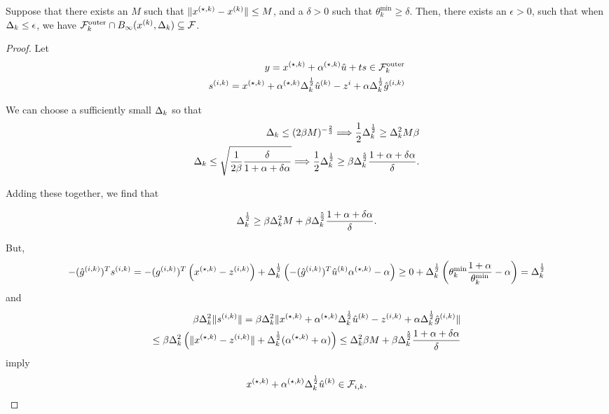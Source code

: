 \begin{theorem}
Suppose that there exists an $M$ such that $\|{x^{(\star, k)}} - {x^{(k)}}\| \le M$, and a $\delta > 0$ such that $\theta^{\text{min}}_k \ge \delta$.
Then, there exists an $\epsilon > 0$, such that when $\Delta_k \le \epsilon$, we have $ {\mathcal {F}^{\text{outer}}_k} \cap B_{\infty}({x^{(k)}}, \Delta_k) \subseteq \mathcal F$.
\end{theorem}

\begin{proof}
Let
\begin{align*}
y = {x^{(\star, k)}} + {\alpha^{(\star, k)}} \hat u + ts \in {\mathcal {F}^{\text{outer}}_k} \\
s^{(i, k)} = {x^{(\star, k)}} + {\alpha^{(\star, k)}}\Delta_k^{\frac 1 2}{{\hat u}^{(k)}} - z^i + \alpha\Delta_k^{\frac 1 2}{{\hat g}^{(i, k)}}\\
\end{align*}

We can choose a sufficiently small $\Delta_k$ so that
\begin{align*}
\Delta_k \le (2\beta M)^{-\frac 2 3} \Longrightarrow \frac 1 2 \Delta_k^{\frac 1 2 } \ge \Delta_k^2 M\beta \\
\Delta_k \le \sqrt{\frac 1 {2\beta} \frac{\delta}{1 + \alpha + \delta\alpha}} \Longrightarrow \frac 1 2 \Delta_k^{\frac 1 2 } \ge \beta\Delta_k^{\frac 5 2}\frac{1 + \alpha + \delta\alpha}{\delta}.
\end{align*}

Adding these together, we find that

\begin{align*}
\Delta_k^{\frac 1 2 } \ge \beta \Delta_k^2 M + \beta \Delta_k^{\frac 5 2}\frac{1 + \alpha + \delta\alpha}{\delta}.
\end{align*}

But,
\begin{align*}
-({{\hat g}^{(i, k)}})^T s^{(i, k)} = -({g^{(i, k)}})^T \left({x^{(\star, k)}} - {z^{(i, k)}}\right) + \Delta_k^{\frac 1 2}\left(-({{\hat g}^{(i, k)}})^T{{\hat u}^{(k)}}{\alpha^{(\star, k)}} - \alpha\right)
\ge 0 + \Delta_k^{\frac 1 2}\left(\theta^{\text{min}}_k \frac{1 + \alpha}{\theta^{\text{min}}_k} - \alpha\right) = \Delta_k^{\frac 1 2 }\\
\end{align*}
and
\begin{align*}
\beta\Delta_k^2\|s^{(i, k)}\| = \beta\Delta_k^2\|{x^{(\star, k)}} + {\alpha^{(\star, k)}}\Delta_k^{\frac 1 2}{{\hat u}^{(k)}} - {z^{(i, k)}} + \alpha\Delta_k^{\frac 1 2}{{\hat g}^{(i, k)}} \| \\
\le \beta\Delta_k^2\left(\|{x^{(\star, k)}} - {z^{(i, k)}} \| + \Delta_k^{\frac 1 2} ({\alpha^{(\star, k)}} + \alpha)\right) 
\le \Delta_k^2\beta M + \beta \Delta_k^{\frac 5 2}\frac{1 + \alpha + \delta\alpha}{\delta}
\end{align*}
imply 
\begin{align*}
{x^{(\star, k)}} + {\alpha^{(\star, k)}}\Delta_k^{\frac 1 2}{{\hat u}^{(k)}} \in {\mathcal F_{i, k}}.
\end{align*}


\end{proof}

